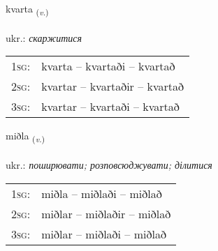 \documentclass[frontgrid, backgrid]{flacards}\usepackage[]{graphicx}\usepackage[]{xcolor}
\begin{document}
\renewcommand{\flhead}{\vskip5pt \fboxsep=0pt {\small\bfseries\footnotesize Sagnorð | дієслово}}
\renewcommand{\fcfoot}{\vskip5pt \fboxsep=0pt \hspace{2pt}{\small\bfseries\footnotesize 2K}}

\renewcommand{\blhead}{\vskip5pt {\small\bfseries\footnotesize Sagnorð | дієслово }}
\renewcommand{\bcfoot}{\vskip5pt \hspace{2pt}{\small\bfseries\footnotesize 2K}}


{kvarta \small{\textsubscript{(\textit{v.})}} \\[1ex] %
\textphonetic{[kʰvar̥ta]} \\
ukr.: \emph{скаржитися} \\  [2ex]
\renewcommand*{\arraystretch}{0.8}
\begin{tabular}{p{1cm}l}
\textsc{1sg}: & kvarta -- kvartaði -- kvartað \\ 
\textsc{2sg}: & kvartar -- kvartaðir -- kvartað \\ 
\textsc{3sg}: & kvartar -- kvartaði -- kvartað \\ 
\end{tabular}
}

\renewcommand{\flhead}{\vskip5pt \fboxsep=0pt {\small\bfseries\footnotesize Sagnorð | дієслово}}
\renewcommand{\fcfoot}{\vskip5pt \fboxsep=0pt \hspace{2pt}{\small\bfseries\footnotesize 2K}}

\renewcommand{\blhead}{\vskip5pt {\small\bfseries\footnotesize Sagnorð | дієслово }}
\renewcommand{\bcfoot}{\vskip5pt \hspace{2pt}{\small\bfseries\footnotesize 2K}}


{miðla \small{\textsubscript{(\textit{v.})}} \\[1ex] %
\textphonetic{[mɪðla]} \\
ukr.: \emph{поширювати; розповсюджувати; ділитися} \\  [2ex]
\renewcommand*{\arraystretch}{0.8}
\begin{tabular}{p{1cm}l}
\textsc{1sg}: & miðla -- miðlaði -- miðlað \\ 
\textsc{2sg}: & miðlar -- miðlaðir -- miðlað \\ 
\textsc{3sg}: & miðlar -- miðlaði -- miðlað \\ 
\end{tabular}
}
\end{document}
